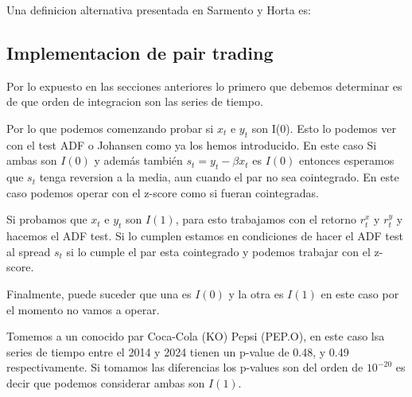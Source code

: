 \documentclass{myarticle}
\begin{document}
Una definicion alternativa presentada en Sarmento y Horta es:

\subsection{Implementacion de pair trading}
Por lo expuesto en las secciones anteriores lo primero que debemos determinar es de que orden de integracion son las series de tiempo.

Por lo que podemos comenzando probar si $x_t$ e $y_t$ son I(0). Esto lo podemos ver con el test ADF o Johansen como ya los hemos introducido. En este caso  Si ambas son $I(0)$ y adem\'as tambi\'en $s_t=y_t - \beta x_t$ es $I(0)$ entonces esperamos que $s_t$ tenga reversion a la media, aun cuando el par no sea cointegrado. En este caso podemos operar con el z-score como si fueran cointegradas. 


Si probamos que $x_t$ e $y_t$ son $I(1)$, para esto trabajamos con el retorno $r_t^x$ y $r_t^y$ y hacemos el ADF test. Si lo cumplen estamos en condiciones de hacer el ADF test al spread $s_t$ si lo cumple el par esta cointegrado y podemos trabajar con el z-score.

Finalmente, puede suceder que una es $I(0)$ y la otra es $I(1)$ en este caso por el momento no vamos a operar.

Tomemos a un conocido par Coca-Cola (KO) Pepsi (PEP.O), en este caso lsa series de tiempo entre el 2014 y 2024 tienen un p-value de 0.48, y 0.49 respectivamente. Si tomamos las diferencias los p-values son del orden de $10^{-20}$ es decir que podemos considerar ambas son $I(1)$.
\end{document}
